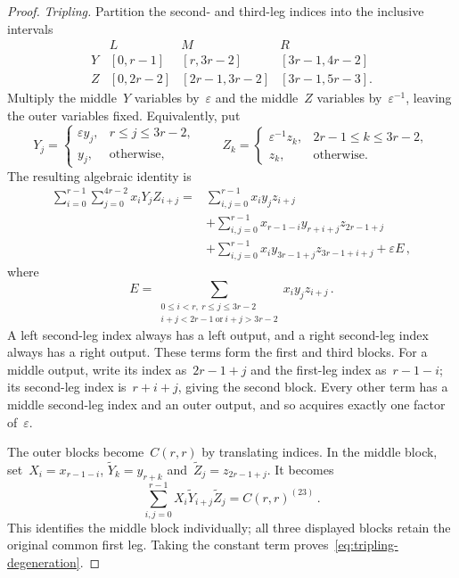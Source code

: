 \documentclass[11pt,letterpaper]{article}
\theoremstyle{definition}
\numberwithin{equation}{section}
\begin{document}
\begin{proof}
\emph{Tripling.} Partition the second- and third-leg indices into the inclusive intervals
\begin{equation*}
 \begin{array}{c|ccc}
 &L&M&R\\\hline
 Y &[0,r-1]&[r,3r-2]&[3r-1,4r-2]\\
 Z &[0,2r-2]&[2r-1,3r-2]&[3r-1,5r-3].
 \end{array}
\end{equation*}
Multiply the middle~$Y$ variables by~$\varepsilon$ and the middle~$Z$ variables by~$\varepsilon^{-1}$, leaving the outer variables fixed. Equivalently, put
\begin{equation*}
 Y_j=\begin{cases}\varepsilon y_j,&r\leq j\leq3r-2,\\y_j,&\text{otherwise},\end{cases}
 \qquad
 Z_k=\begin{cases}\varepsilon^{-1}z_k,&2r-1\leq k\leq3r-2,\\z_k,&\text{otherwise}.\end{cases}
\end{equation*}
The resulting algebraic identity is
\begin{equation}\label{eq:tripling-explicit}
\begin{aligned}
 \sum_{i=0}^{r-1}\sum_{j=0}^{4r-2}x_iY_jZ_{i+j}
 ={}&\sum_{i,j=0}^{r-1}x_i y_jz_{i+j}\\
 &+\sum_{i,j=0}^{r-1}x_{r-1-i}y_{r+i+j}z_{2r-1+j}\\
 &+\sum_{i,j=0}^{r-1}x_i y_{3r-1+j}z_{3r-1+i+j}
 +\varepsilon E\,,
\end{aligned}
\end{equation}
where
\begin{equation*}
 E=\sum_{\substack{0\leq i<r,\ r\leq j\leq3r-2\\
 i+j<2r-1\ \text{or}\ i+j>3r-2}}x_i y_jz_{i+j}\,.
\end{equation*}
A left second-leg index always has a left output, and a right second-leg index always has a right output. These terms form the first and third blocks. For a middle output, write its index as~$2r-1+j$ and the first-leg index as~$r-1-i$; its second-leg index is~$r+i+j$, giving the second block. Every other term has a middle second-leg index and an outer output, and so acquires exactly one factor of~$\varepsilon$.

The outer blocks become~$C(r,r)$ by translating indices. In the middle block, set~$X_i=x_{r-1-i}$, $\widetilde Y_k=y_{r+k}$ and~$\widetilde Z_j=z_{2r-1+j}$. It becomes
\begin{equation*}
 \sum_{i,j=0}^{r-1}X_i\widetilde Y_{i+j}\widetilde Z_j
 =C(r,r)^{(23)}\,.
\end{equation*}
This identifies the middle block individually; all three displayed blocks retain the original common first leg. Taking the constant term proves~\eqref{eq:tripling-degeneration}.


\end{proof}
\end{document}
